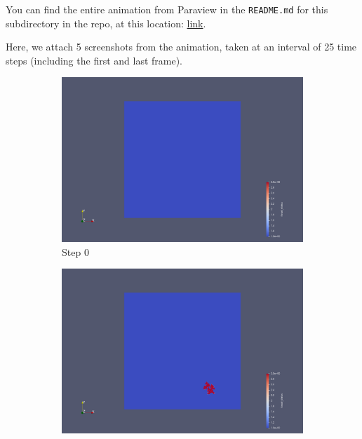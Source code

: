 \documentclass[a4paper,12pt]{article}
\begin{document}
You can find the entire animation from Paraview in the \verb|README.md| for this subdirectory in the repo, at this location: \href{https://github.com/paulmyr/DD2358-HPC25/blob/master/04_parallel/exercise1/README.md#the-vtk-visualization-on-paraview}{link}.

Here, we attach 5 screenshots from the animation, taken at an interval of 25 time steps (including the first and last frame).

\begin{figure}
\centering
\begin{subfigure}{0.4\textwidth}
    \includegraphics[width=\textwidth]{../images/vtk/ex1/step_0.png}
    \caption{Step 0}
\end{subfigure}
\hfill
\begin{subfigure}{0.4\textwidth}
    \includegraphics[width=\textwidth]{../images/vtk/ex1/step_25.png}

\end{subfigure}
\end{figure}
\end{document}
